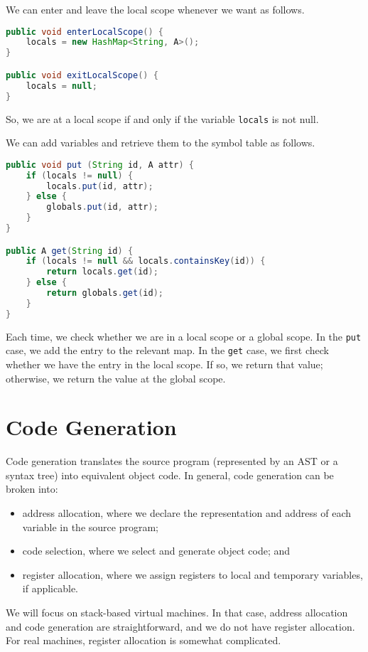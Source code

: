 \documentclass[a4paper, openany]{memoir}
\begin{document}
We can enter and leave the local scope whenever we want as follows.
\begin{lstlisting}[language=java]
public void enterLocalScope() {
    locals = new HashMap<String, A>();
}

public void exitLocalScope() {
    locals = null;
}
\end{lstlisting}
So, we are at a local scope if and only if the variable \texttt{locals} is not null.

We can add variables and retrieve them to the symbol table as follows.
\begin{lstlisting}[language=java]
public void put (String id, A attr) {
    if (locals != null) {
        locals.put(id, attr);
    } else {
        globals.put(id, attr);
    }
}

public A get(String id) {
    if (locals != null && locals.containsKey(id)) {
        return locals.get(id);
    } else {
        return globals.get(id);
    }
}
\end{lstlisting}
Each time, we check whether we are in a local scope or a global scope. In the \texttt{put} case, we add the entry to the relevant map. In the \texttt{get} case, we first check whether we have the entry in the local scope. If so, we return that value; otherwise, we return the value at the global scope.

\newpage

\section{Code Generation}
Code generation translates the source program (represented by an AST or a syntax tree) into equivalent object code. In general, code generation can be broken into:
\begin{itemize}
    \item address allocation, where we declare the representation and address of each variable in the source program;
    \item code selection, where we select and generate object code; and
    \item register allocation, where we assign registers to local and temporary variables, if applicable.
\end{itemize}

We will focus on stack-based virtual machines. In that case, address allocation and code generation are straightforward, and we do not have register allocation. For real machines, register allocation is somewhat complicated.
\end{document}
